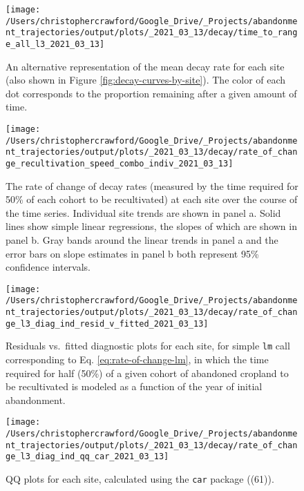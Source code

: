 \documentclass[9pt,twocolumn,twoside,lineno]{pnas-new}
\begin{document}
\begin{figure}
\texttt{[image: /Users/christophercrawford/Google\_Drive/\_Projects/abandonment\_trajectories/output/plots/\_2021\_03\_13/decay/time\_to\_range\_all\_l3\_2021\_03\_13]} \caption{An alternative representation of the mean decay rate for each site (also shown in Figure \ref{fig:decay-curves-by-site}). The color of each dot corresponds to the proportion remaining after a given amount of time.}\label{fig:decay-time-to-range}
\end{figure}



\begin{figure}
\texttt{[image: /Users/christophercrawford/Google\_Drive/\_Projects/abandonment\_trajectories/output/plots/\_2021\_03\_13/decay/rate\_of\_change\_recultivation\_speed\_combo\_indiv\_2021\_03\_13]} \caption{The rate of change of decay rates (measured by the time required for 50\% of each cohort to be recultivated) at each site over the course of the time series. Individual site trends are shown in panel a. Solid lines show simple linear regressions, the slopes of which are shown in panel b. Gray bands around the linear trends in panel a and the error bars on slope estimates in panel b both represent 95\% confidence intervals.}\label{fig:decay-rate-of-change}
\end{figure}



\begin{figure}
\texttt{[image: /Users/christophercrawford/Google\_Drive/\_Projects/abandonment\_trajectories/output/plots/\_2021\_03\_13/decay/rate\_of\_change\_l3\_diag\_ind\_resid\_v\_fitted\_2021\_03\_13]} \caption{Residuals vs.~fitted diagnostic plots for each site, for simple \texttt{lm} call corresponding to Eq. \eqref{eq:rate-of-change-lm}, in which the time required for half (50\%) of a given cohort of abandoned cropland to be recultivated is modeled as a function of the year of initial abandonment.}\label{fig:rate-of-change-diag-resid-fitted}
\end{figure}



\begin{figure}
\texttt{[image: /Users/christophercrawford/Google\_Drive/\_Projects/abandonment\_trajectories/output/plots/\_2021\_03\_13/decay/rate\_of\_change\_l3\_diag\_ind\_qq\_car\_2021\_03\_13]} \caption{QQ plots for each site, calculated using the \texttt{car} package ((61)).}\label{fig:rate-of-change-diag-qq}
\end{figure}
\end{document}
